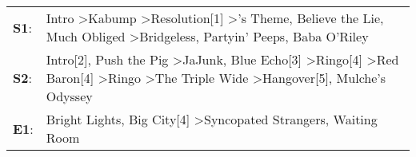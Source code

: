 \begin{supertabular}{p{0.03\textwidth}p{0.92\textwidth}}
 \textbf{S1}:  &                                                               Intro\textsuperscript{} \textgreater \enspace Kabump\textsuperscript{} \textgreater \enspace Resolution[1]\textsuperscript{} \textgreater {}'s Theme\textsuperscript{}, \enspace Believe the Lie\textsuperscript{}, \enspace Much Obliged\textsuperscript{} \textgreater \enspace Bridgeless\textsuperscript{}, \enspace Partyin' Peeps\textsuperscript{}, \enspace Baba O'Riley\textsuperscript{}  \enspace  \\
 \textbf{S2}:  &  Intro[2]\textsuperscript{}, \enspace Push the Pig\textsuperscript{} \textgreater \enspace JaJunk\textsuperscript{}, \enspace Blue Echo[3]\textsuperscript{} \textgreater \enspace Ringo[4]\textsuperscript{} \textgreater \enspace Red Baron[4]\textsuperscript{} \textgreater \enspace Ringo\textsuperscript{} \textgreater \enspace The Triple Wide\textsuperscript{} \textgreater \enspace Hangover[5]\textsuperscript{}, \enspace Mulche's Odyssey\textsuperscript{}  \enspace  \\
 \textbf{E1}:  &                                                                                                                                                                                                                                                                                                                        Bright Lights, Big City[4]\textsuperscript{} \textgreater \enspace Syncopated Strangers\textsuperscript{}, \enspace Waiting Room\textsuperscript{}  \enspace  \\
\end{supertabular}
